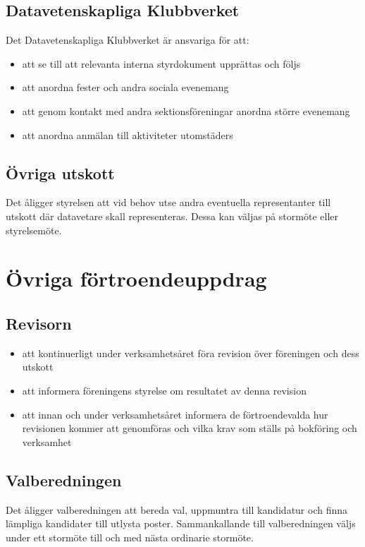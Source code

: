 \documentclass[a4paper]{article}
\begin{document}
{  \subsection{Datavetenskapliga Klubbverket}
  Det Datavetenskapliga Klubbverket är ansvariga för att:
  \begin{itemize}
    \item att se till att relevanta interna styrdokument upprättas och följs
    \item att anordna fester och andra sociala evenemang
    \item att genom kontakt med andra sektionsföreningar anordna större evenemang
    \item att anordna anmälan till aktiviteter utomstäders
  \end{itemize}
  
  \subsection{Övriga utskott}
  Det åligger styrelsen att vid behov utse andra eventuella representanter till utskott där datavetare skall representeras. Dessa kan väljas på stormöte eller styrelsemöte.}

\section{Övriga förtroendeuppdrag}
\subsection{Revisorn}
  \begin{itemize}
    \item att kontinuerligt under verksamhetsåret föra revision över föreningen och dess utskott
    \item att informera föreningens styrelse om resultatet av denna revision
    \item att innan och under verksamhetsåret informera de förtroendevalda hur revisionen kommer att genomföras och vilka krav som ställs på bokföring och verksamhet
  \end{itemize}
  
  \subsection{Valberedningen}
  Det åligger valberedningen att bereda val, uppmuntra till kandidatur och finna
  lämpliga kandidater till utlysta poster. Sammankallande till valberedningen
  väljs under ett stormöte till och med nästa ordinarie stormöte.
\end{document}
